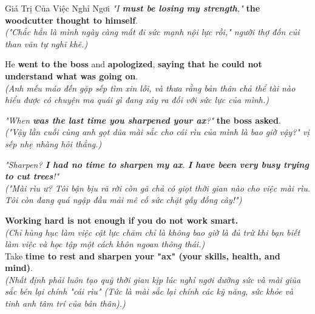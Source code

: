 \begin{truyen}{Giá Trị Của Việc Nghỉ Ngơi}
\textit{"I \textbf{must be losing my strength},"} \textbf{the woodcutter thought to himself}.\\
\textit{("Chắc hẳn là mình ngày càng mất đi sức mạnh nội lực rồi," người thợ đốn củi than vãn tự nghĩ khẽ.)}

He \textbf{went to the boss} and \textbf{apologized}, \textbf{saying that he could not understand what was going on}.\\
\textit{(Anh mếu máo đến gặp sếp tìm xin lỗi, và thưa rằng bản thân chả thể tài nào hiểu được có chuyện ma quái gì đang xảy ra đối với sức lực của mình.)}

\textit{"When \textbf{was the last time you sharpened your ax}?"} \textbf{the boss asked}.\\
\textit{("Vậy lần cuối cùng anh gọt dũa mài sắc cho cái rìu của mình là bao giờ vậy?" vị sếp nhẹ nhàng hỏi thẳng.)}

\textit{"Sharpen? \textbf{I had no time to sharpen my ax}. \textbf{I have been very busy trying to cut trees}!"}\\
\textit{("Mài rìu ư? Tôi bận bịu rã rời còn gã chả có giọt thời gian nào cho việc mài rìu. Tôi còn đang quá ngập đầu mải mê cố sức chặt gẫy đống cây!")}
\end{truyen}

\begin{baihoc}
  \textbf{Working hard is not enough if you do not work smart.}\\
  \textit{(Chỉ hùng hục làm việc cật lực chăm chỉ là không bao giờ là đủ trừ khi bạn biết làm việc và học tập một cách khôn ngoan thông thái.)}\\
  Take \textbf{time to rest and sharpen your "ax" (your skills, health, and mind)}.\\
  \textit{(Nhất định phải luôn tạo quỹ thời gian kịp lúc nghỉ ngơi dưỡng sức và mài giũa sắc bén lại chính "cái rìu" (Tức là mài sắc lại chính các kỹ năng, sức khỏe và tinh anh tâm trí của bản thân).)}
\end{baihoc}

\vspace{0.8cm}


\ngayDay{}

